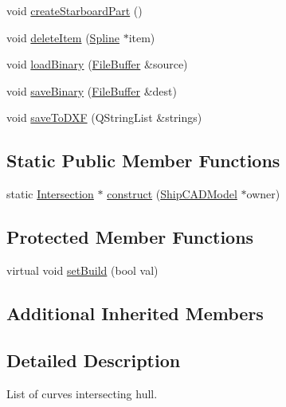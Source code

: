 \begin{DoxyCompactItemize}
\item 
void \hyperlink{classShipCAD_1_1Intersection_a0af2af543403b3c69d1d3c786a1c6575}{create\-Starboard\-Part} ()
\item 
void \hyperlink{classShipCAD_1_1Intersection_ada420a69dc8141794aa617f966cbe2b2}{delete\-Item} (\hyperlink{classShipCAD_1_1Spline}{Spline} $\ast$item)
\item 
void \hyperlink{classShipCAD_1_1Intersection_a3e87aa28a1e1d721fe657a73d5466f3b}{load\-Binary} (\hyperlink{classShipCAD_1_1FileBuffer}{File\-Buffer} \&source)
\item 
void \hyperlink{classShipCAD_1_1Intersection_a41ce3a17845a7808d052713ae57dbe63}{save\-Binary} (\hyperlink{classShipCAD_1_1FileBuffer}{File\-Buffer} \&dest)
\item 
void \hyperlink{classShipCAD_1_1Intersection_a00a6d7ad7e82e43bd0287fa88dd87cf3}{save\-To\-D\-X\-F} (Q\-String\-List \&strings)
\end{DoxyCompactItemize}
\subsection*{Static Public Member Functions}
\begin{DoxyCompactItemize}
\item 
static \hyperlink{classShipCAD_1_1Intersection}{Intersection} $\ast$ \hyperlink{classShipCAD_1_1Intersection_af25c4beb86f658e5ed9058eaf3b419e1}{construct} (\hyperlink{classShipCAD_1_1ShipCADModel}{Ship\-C\-A\-D\-Model} $\ast$owner)
\end{DoxyCompactItemize}
\subsection*{Protected Member Functions}
\begin{DoxyCompactItemize}
\item 
virtual void \hyperlink{classShipCAD_1_1Intersection_a2b496f9ab21c5fc4a7b97a665b24f2b1}{set\-Build} (bool val)
\end{DoxyCompactItemize}
\subsection*{Additional Inherited Members}


\subsection{Detailed Description}
List of curves intersecting hull. 

